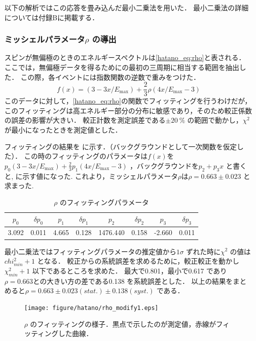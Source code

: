 以下の解析ではこの応答を畳み込んだ最小二乗法を用いた．
最小二乗法の詳細については付録Bに掲載する．

\subsubsection{ミッシェルパラメータ$\rho$ の導出}
スピンが無偏極のときのエネルギースペクトルは\eqref{hatano_eq:rho}と表される．
ここでは，無偏極データを得るためにの最初の三周期に相当する範囲を抽出した．
この際，各イベントには指数関数の逆数で重みをつけた．
\begin{equation}
  f(x)=(3 - 3x / E_\mathrm{max})+\frac{2}{3}\rho(4x / E_\mathrm{max} - 3)
  \label{hatano_eq:rho}
\end{equation}
このデータに対して，\eqref{hatano_eq:rho}の関数でフィッティングを行うわけだが，このフィッティングは高エネルギー部分の分布に敏感であり，そのため較正係数の誤差の影響が大きい．
較正計数を測定誤差である$\pm 20~\%$ の範囲で動かし，$\chi^2$ が最小になったときを測定値とした．

フィッティングの結果を に示す．（バックグラウンドとして一次関数を仮定した）．
この時のフィッティングのパラメータは$f(x)$を$p_0(3 - 3x / E_\mathrm{max}) + \frac{2}{3} p_{1} (4x / E_\mathrm{max} - 3)$ ，バックグラウンドを$p_2+p_3x$ と書くと, に示す値になった.
これより，ミッシェルパラメータ$\rho$は$\rho=0.663 \pm 0.023$ と求まった.

\begin{table}[hbt]
\centering
\caption{$\rho$ のフィッティングパラメータ}
\begin{tabular}{cc|cc|cc|cc}
$p_0$ & $\delta p_0$ & $p_1$ & $\delta p_1$ & $p_2$ & $\delta p_2$ & $p_3$ & $\delta p_3$ \\ \hline
3.092 & 0.011 & 4.665 & 0.128 & 1476.440 & 0.158 & -2.660 & 0.011
\end{tabular}
\label{hatano_tab:rho}
\end{table}

最小二乗法ではフィッティングパラメータの推定値から$1\sigma$ ずれた時に$\chi^2$ の値は$chi^2_{min}+1$ となる．\cite{leo} 
較正からの系統誤差を求めるために，較正較正を動かし$\chi^{2}_{min} + 1$ 以下であるところを求めた．
最大で0.801，最小で0.617 であり$\rho=0.663$との大きい方の差である0.138 を系統誤差とした．
以上の結果をまとめると$\rho=0.663 \pm 0.023 (stat.) \pm 0.138 (syst.)$ である．

\begin{figure}[hbt]
\centering
\texttt{[image: figure/hatano/rho\_modify1.eps]}
\caption{$\rho$ のフィッティングの様子．黒点で示したのが測定値，赤線がフィッティングした曲線．}
\label{hatano_fig:rho}
\end{figure}

